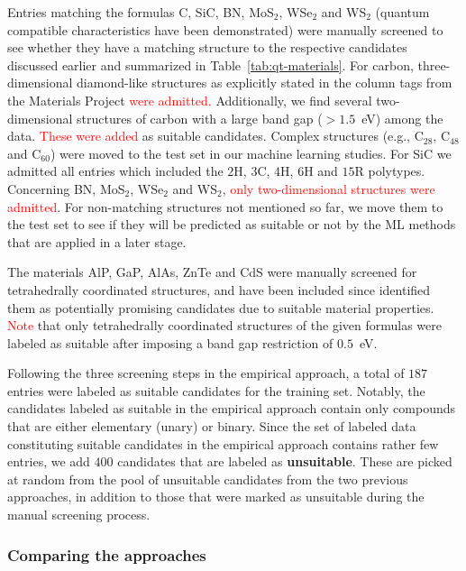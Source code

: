 \documentclass[superscriptaddress,unsortedaddress,
 amsmath,amssymb,
 aps,
]{revtex4-2}
\newcommand{\mrk}[1]{\textcolor{red}{#1}}
\begin{document}
Entries matching the formulas C, SiC, BN, MoS$_2$, WSe$_2$ and WS$_2$ (quantum compatible characteristics have been demonstrated) were manually screened to see whether they have a matching structure to the respective candidates discussed earlier and summarized in Table~\ref{tab:qt-materials}. 
For carbon, three-dimensional diamond-like structures as explicitly stated in the column tags from the Materials Project \mrk{were admitted.} Additionally, we find several two-dimensional structures of carbon with a large band gap ($>1.5$~eV) among the data. \mrk{These were added} as suitable candidates. Complex structures (e.g., C$_{28}$, C$_{48}$ and C$_{60}$) were moved to the test set in our machine learning studies. For SiC we admitted all entries which included the $2$H, $3$C, $4$H, $6$H and $15$R polytypes. Concerning BN, MoS$_2$, WSe$_2$ and WS$_2$, \mrk{only two-dimensional structures were admitted}. For non-matching structures not mentioned so far, we move them to the test set to see if they will be predicted as suitable or not by the ML methods that are applied in a later stage.

The materials AlP, GaP, AlAs, ZnTe and CdS were manually screened for tetrahedrally coordinated structures, and have been included since \citeauthor{Weber2010} \cite{Weber2010} identified them as potentially promising candidates due to suitable material properties. 
\mrk{Note} that only tetrahedrally coordinated structures of the given formulas were labeled as suitable after imposing a band gap restriction of $0.5$~eV. 

Following the three screening steps in the empirical approach, a total of $187$ entries were labeled as suitable candidates for the training set. 
Notably, the candidates labeled as suitable in the empirical approach contain only compounds that are either elementary (unary) or binary. 
Since the set of labeled data constituting suitable candidates in the empirical approach contains rather few entries, we add $400$ candidates that are labeled as \textbf{unsuitable}. These are picked at random from the pool of unsuitable candidates from the two previous approaches, in addition to those that were marked as unsuitable during the manual screening process. 

\subsubsection*{Comparing the approaches}
\end{document}
